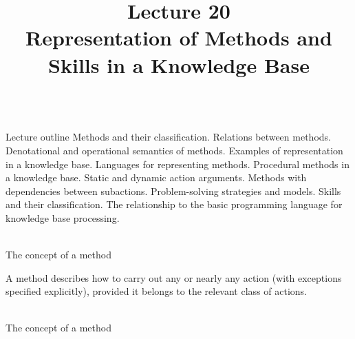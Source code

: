 \title{Lecture 20\\Representation of Methods and Skills in a Knowledge Base}

\begin{frame}
	\titlepage
\end{frame}

\begin{frame}{\\Lecture outline}
	\topline
	\justifying
	Methods and their classification. Relations between methods. Denotational and operational semantics of methods. Examples of representation in a knowledge base. Languages for representing methods. Procedural methods in a knowledge base. Static and dynamic action arguments. Methods with dependencies between subactions. Problem-solving strategies and models. Skills and their classification. The relationship to the basic programming language for knowledge base processing.
\end{frame}

\begin{frame}{\\The concept of a method}
	\topline
	\justifying

    A method describes how to carry out any or nearly any action (with exceptions specified explicitly),
    provided it belongs to the relevant class of actions.

    \begin{SCn}
    \end{SCn}
\end{frame}

\begin{frame}{\\The concept of a method}
	\topline
	\justifying
    \begin{SCn}
    \end{SCn}
\end{frame}

